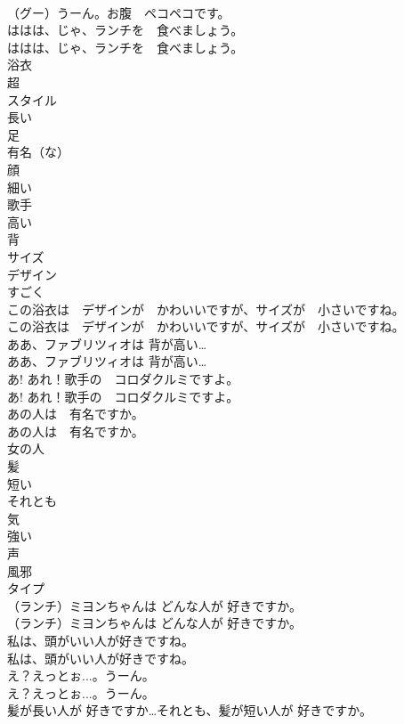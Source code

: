 \documentclass[8pt]{extreport}
\begin{document}
\begin{CJK}{UTF8}{min}
\\	（グー）うーん。お腹　ペコペコです。 
\\	ははは、じゃ、ランチを　食べましょう。	
\\	ははは、じゃ、ランチを　食べましょう。 
\\	浴衣
\\	超
\\	スタイル
\\	長い
\\	足
\\	有名（な）
\\	顔
\\	細い
\\	歌手
\\	高い
\\	背
\\	サイズ
\\	デザイン
\\	すごく
\\	この浴衣は　デザインが　かわいいですが、サイズが　小さいですね。	
\\	この浴衣は　デザインが　かわいいですが、サイズが　小さいですね。 
\\	ああ、ファブリツィオは 背が高い…	
\\	ああ、ファブリツィオは 背が高い… 
\\	あ! あれ！歌手の　コロダクルミですよ。	
\\	あ! あれ！歌手の　コロダクルミですよ。 
\\	あの人は　有名ですか。	
\\	あの人は　有名ですか。 
\\	女の人
\\	髪
\\	短い
\\	それとも
\\	気
\\	強い
\\	声
\\	風邪
\\	タイプ
\\	（ランチ）ミヨンちゃんは どんな人が 好きですか。	
\\	（ランチ）ミヨンちゃんは どんな人が 好きですか。 
\\	私は、頭がいい人が好きですね。	
\\	私は、頭がいい人が好きですね。 
\\	え？えっとぉ...。うーん。	
\\	え？えっとぉ...。うーん。 
\\	髪が長い人が 好きですか…それとも、髪が短い人が 好きですか。	

\end{CJK}
\end{document}
